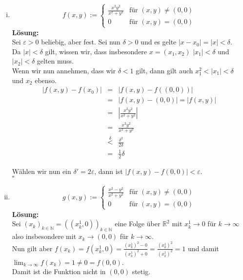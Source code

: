 \documentclass[11pt,a4paper,ngerman]{article}
\begin{document}
\begin{enumerate}[(i)]
	\item
		$$
			f(x,y) := \left\{ 
			\begin{array}{lr}
				\frac{x^2y^2}{x^2+y^2} & \text{für }(x,y)\not= (0,0)\\
				0& \text{für }(x,y) = (0,0)
			\end{array}\right.
		$$
	\textbf{Lösung:}\\
		Sei $\varepsilon > 0$ beliebig, aber fest. Sei nun $\delta > 0$ und es gelte $|x - x_0| = |x| < \delta$.\\
		Da $|x| < \delta$ gilt, wissen wir, dass insbesondere $x=(x_1,x_2)$ $|x_1| < \delta $ und $|x_2| < \delta$ gelten muss.\\
		Wenn wir nun annehmen, dass wir $\delta < 1 $ gilt, dann gilt auch $x_1^2 < |x_1| < \delta$ und $x_2$ ebenso.\\

		$$\begin{array}{rcl}
			|f(x,y) - f(x_0)| &=& | f(x,y) - f((0,0)) |\\
				&=& |f(x,y) - (0,0)| = |f(x,y)|\\
				&=& | \frac{x^2y^2}{x^2 + y^2} |\\
				&=& \frac{x^2 y^2}{x^2 + y^2}\\
				&\stackrel{\delta}{<}& \frac{\delta^2}{2\delta}\\
				&=& \frac{1}{2} \delta
		\end{array}$$

		Wählen wir nun ein $\delta ' = 2 \varepsilon$, dann ist $|f(x,y) - f(0,0)| < \varepsilon$.\\
		\mbox{} \hfill $\square$

	\item
		$$
			g(x,y) := \left\{
				\begin{array}{lr}
					\frac{x^2 - y^2}{x^2 + y^2} & \text{für }(x,y) \not= (0,0) \\
					0 & \text{für } (x,y) = (0,0)
				\end{array}
			\right.
		$$
	\textbf{Lösung:}\\
		Sei $(x_k)_{k \in \mathbb{N}} = \left((x_k^1,0)\right)_{k \in \mathbb{N}}$ eine Folge über $\mathbb{R}^2$ mit $x_k^1 \to 0$ für $k \to \infty$ also insbesondere mit $x_k \to (0,0)$ für $k \to \infty$. \\

    Nun gilt aber $f(x_k) = f(x_k^1,0) = \frac{\left(x_k^1\right)^2 - 0}{\left(x_k^1\right)^2 + 0} = \frac{\left(x_k^1\right)^2}{\left(x_k^1\right)^2} = 1$ und damit $\lim_{k \to \infty} f(x_k) = 1 \neq 0 = f(0,0)$. \\
  Damit ist die Funktion nicht in $(0,0)$ stetig.
\end{enumerate}
\end{document}
